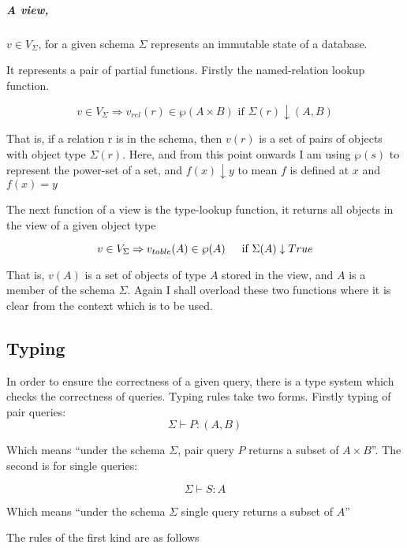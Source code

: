 \documentclass[12pt,a4paper,twoside,openright]{report}
\begin{document}
\subparagraph{A view,} $v \in V_\Sigma$, for a given schema $\Sigma$ represents an immutable state of a database.

It represents a pair of partial functions. Firstly the named-relation lookup function.

\begin{equation}
v \in V_\Sigma \Rightarrow v_{rel}(r) \in \wp(A \times B)\mbox{ if $\Sigma(r)\downarrow (A, B)$}
\end{equation} 

That is, if a relation r is in the schema, then $v(r)$ is a set of pairs of objects with object type $\Sigma(r)$. Here, and from this point onwards I am using $\wp(s)$ to represent the power-set of a set, and $f(x) \downarrow y$ to mean $f$ is defined at $x$ and $f(x)=y$


The next function of a view is the type-lookup function, it returns all objects in the view of a given object type

\begin{equation}
v \in V_\Sigma \Rightarrow v_{table}(A) \in \wp(A)\indent \mbox{if $\Sigma(A)\downarrow True$}
\end{equation} 

That is, $v(A)$ is a set of objects of type $A$ stored in the view, and $A$ is a member of the schema $\Sigma$. Again I shall overload these two functions where it is clear from the context which is to be used.
 
\subsection{Typing}
In order to ensure the correctness of a given query, there is a type system which checks the correctness of queries. Typing rules take two forms. Firstly typing of pair queries:
\[ \Sigma \vdash P\colon (A, B)\]

Which means ``under the schema $\Sigma$, pair query $P$ returns a subset of $A \times B$''.  The second is for single queries:

\[ \Sigma \vdash S \colon A \]

Which means ``under the schema $\Sigma$ single query returns a subset of $A$''

The rules of the first kind are as follows
\end{document}

